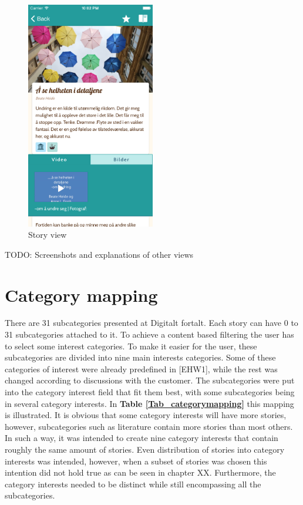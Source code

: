 \begin{figure}[h!]
	\centering
	\includegraphics[width=0.5\textwidth]{fig/story_view}
	\caption{Story view}
	\label{story_view}
\end{figure}

TODO: Screenshots and explanations of other views

\section{Category mapping} 
\label{sec_categorymapping}

There are 31 subcategories presented at Digitalt fortalt. Each story can have 0 to 31 subcategories attached to it. To achieve a content based filtering the user has to select some interest categories. To make it easier for the user, these subcategories are divided into nine main interests categories. Some of these categories of interest were already predefined in [EHW1], while the rest was changed according to discussions with the customer. The subcategories were put into the category interest field that fit them best, with some subcategories being in several category interests. In \textbf{Table \ref{Tab_categorymapping}} this mapping is illustrated. It is obvious that some category interests will have more stories, however, subcategories such as literature contain more stories than most others. In such a way, it was intended to create nine category interests that contain roughly the same amount of stories. Even distribution of stories into category interests was intended, however, when a subset of stories was chosen this intention did not hold true as can be seen in chapter XX. Furthermore, the category interests needed to be distinct while still encompassing all the subcategories. 

